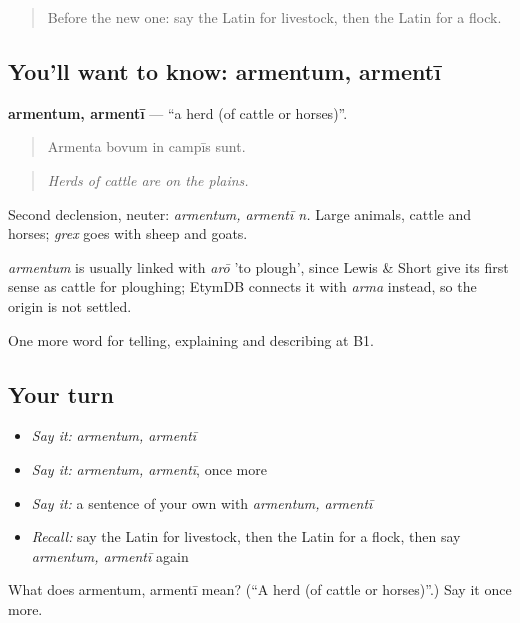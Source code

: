 \begin{quote}
Before the new one: say the Latin for livestock, then the Latin for a flock.
\end{quote}

\subsection*{You'll want to know: armentum, armentī}
\textbf{armentum, armentī} — \textquotedblleft{}a herd (of cattle or horses)\textquotedblright{}.

\begin{quote}
Armenta bovum in campīs sunt.
\end{quote}

\begin{quote}
\emph{Herds of cattle are on the plains.}
\end{quote}

Second declension, neuter: \emph{armentum, armentī n.} Large animals, cattle and horses; \emph{grex} goes with sheep and goats.

\begin{cousinweb}
\emph{armentum} is usually linked with \emph{arō} 'to plough', since Lewis \& Short give its first sense as cattle for ploughing; EtymDB connects it with \emph{arma} instead, so the origin is not settled.
\end{cousinweb}

\begin{grammarlens}[title={What you've built}]
One more word for telling, explaining and describing at B1.
\end{grammarlens}

\subsection*{Your turn}
\begin{itemize}
\raggedright
  \item \emph{Say it:} \emph{armentum, armentī}
  \item \emph{Say it:} \emph{armentum, armentī}, once more
  \item \emph{Say it:} a sentence of your own with \emph{armentum, armentī}
  \item \emph{Recall:} say the Latin for livestock, then the Latin for a flock, then say \emph{armentum, armentī} again
\end{itemize}

\begin{tcolorbox}[breakable,colback=teal!4,colframe=teal!35!black,title={Before you move on}]
What does armentum, armentī mean? (\textquotedblleft{}A herd (of cattle or horses)\textquotedblright{}.) Say it once more.
\end{tcolorbox}

